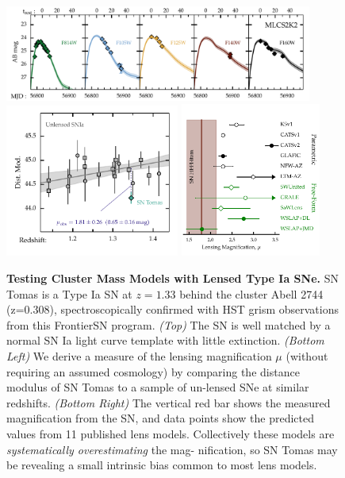 \documentclass[12pt]{article}
\begin{document}
\begin{figure}[b!]
\centering
  \includegraphics[width=0.9\textwidth]{FIG/snTomas_lightcurve_fit_magAB.pdf} \\
  \includegraphics[width=0.51\textwidth]{FIG/snTomas_hubble_diagram.pdf}
  \includegraphics[width=0.41\textwidth]{FIG/snTomas_magnifications.pdf}
\caption{ \label{fig:tomas} \small {\bf Testing Cluster Mass Models
    with Lensed Type Ia SNe.}  SN Tomas is a Type Ia SN at $z=1.33$
  behind the cluster Abell 2744 (z=0.308), spectroscopically confirmed
  with HST grism observations from this FrontierSN program.
  {\it(Top)} The SN is well matched by a normal SN Ia light curve
  template with little extinction.  {\it(Bottom Left)} We derive a
  measure of the lensing magnification $\mu$ (without requiring an
  assumed cosmology) by comparing the distance modulus of SN Tomas to
  a sample of un-lensed SNe at similar redshifts.  {\it (Bottom
    Right)} The vertical red bar shows the measured magnification from
  the SN, and data points show the predicted values from 11 published
  lens models. Collectively these models are {\it systematically
    overestimating} the mag- nification, so SN Tomas may be revealing a
  small intrinsic bias common to most lens models. }
\end{figure}
\end{document}
